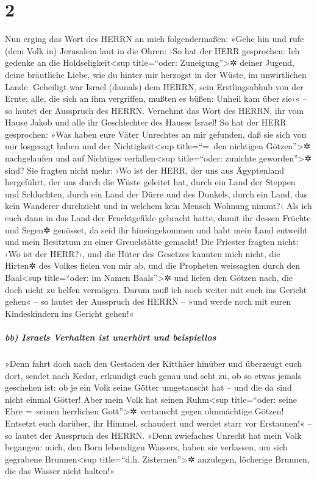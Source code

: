 \hypertarget{section-1}{%
\section{2}\label{section-1}}

Nun erging das Wort des HERRN an mich folgendermaßen:
»Gehe hin und rufe (dem Volk in) Jerusalem laut in die
Ohren: ›So hat der HERR gesprochen: Ich gedenke an die
Holdseligkeit\textless sup title=``oder: Zuneigung''\textgreater✲ deiner
Jugend, deine bräutliche Liebe, wie du hinter mir herzogst in der Wüste,
im unwirtlichen Lande. Geheiligt war Israel (damals) dem
HERRN, sein Erstlingsabhub von der Ernte; alle, die sich an ihm
vergriffen, mußten es büßen: Unheil kam über sie‹« -- so lautet der
Ausspruch des HERRN. Vernehmt das Wort des HERRN, ihr vom
Hause Jakob und alle ihr Geschlechter des Hauses Israel!
So hat der HERR gesprochen: »Was haben eure Väter
Unrechtes an mir gefunden, daß sie sich von mir losgesagt haben und der
Nichtigkeit\textless sup title=``=~den nichtigen Götzen''\textgreater✲
nachgelaufen und auf Nichtiges verfallen\textless sup title=``oder:
zunichte geworden''\textgreater✲ sind? Sie fragten nicht
mehr: ›Wo ist der HERR, der uns aus Ägyptenland hergeführt, der uns
durch die Wüste geleitet hat, durch ein Land der Steppen und Schluchten,
durch ein Land der Dürre und des Dunkels, durch ein Land, das kein
Wanderer durchzieht und in welchem kein Mensch Wohnung nimmt?‹
Als ich euch dann in das Land der Fruchtgefilde gebracht
hatte, damit ihr dessen Früchte und Segen✲ genösset, da seid ihr
hineingekommen und habt mein Land entweiht und mein Besitztum zu einer
Greuelstätte gemacht! Die Priester fragten nicht: ›Wo ist
der HERR?‹, und die Hüter des Gesetzes kannten mich nicht, die Hirten✲
des Volkes fielen von mir ab, und die Propheten weissagten durch den
Baal\textless sup title=``oder: im Namen Baals''\textgreater✲ und liefen
den Götzen nach, die doch nicht zu helfen vermögen. Darum
muß ich noch weiter mit euch ins Gericht gehen« -- so lautet der
Ausspruch des HERRN -- »und werde noch mit euren Kindeskindern ins
Gericht gehen!«

\hypertarget{bb-israels-verhalten-ist-unerhuxf6rt-und-beispiellos}{%
\subparagraph{bb) Israels Verhalten ist unerhört und
beispiellos}\label{bb-israels-verhalten-ist-unerhuxf6rt-und-beispiellos}}

»Denn fahrt doch nach den Gestaden der Kitthäer hinüber
und überzeugt euch dort, sendet nach Kedar, erkundigt euch genau und
seht zu, ob so etwas jemals geschehen ist: ob je ein Volk
seine Götter umgetauscht hat -- und die da sind nicht einmal Götter!
Aber mein Volk hat seinen Ruhm\textless sup title=``oder: seine Ehre
=~seinen herrlichen Gott''\textgreater✲ vertauscht gegen ohnmächtige
Götzen! Entsetzt euch darüber, ihr Himmel, schaudert und
werdet starr vor Erstaunen!« -- so lautet der Ausspruch des HERRN.
»Denn zwiefaches Unrecht hat mein Volk begangen: mich,
den Born lebendigen Wassers, haben sie verlassen, um sich gegrabene
Brunnen\textless sup title=``d.h. Zisternen''\textgreater✲ anzulegen,
löcherige Brunnen, die das Wasser nicht halten!«

